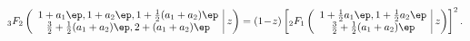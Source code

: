 \begin{equation}
{}_{3}F_2 \left(\begin{array}{c|}
1+a_1 \ep, 1+ a_2 \ep, 1+ \tfrac{1}{2}(a_1+a_2)\ep  \\
\tfrac{3}{2}+ \tfrac{1}{2}(a_1+a_2)\ep, 2+(a_1+a_2)\ep \end{array} ~z
\right) =
(1\!-\!z) \left[
{}_{2}F_1 \left(\begin{array}{c|} 1+\tfrac{1}{2} a_1 \ep,
1+\tfrac{1}{2} a_2 \ep \\
\tfrac{3}{2}+\tfrac{1}{2}(a_1+a_2)\ep \end{array} ~z \right)
\right]^2 .
\label{less_trivial}
\end{equation}

